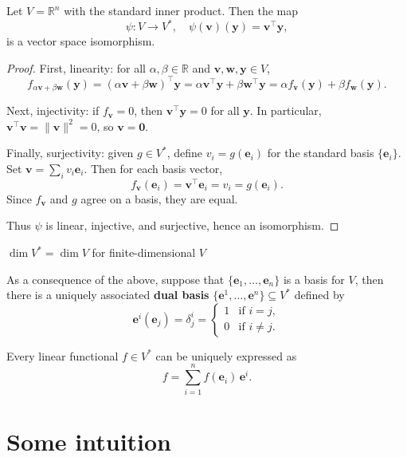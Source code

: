 \begin{theorem}\label{isomorphism}
Let $V = \mathbb{R}^n$ with the standard inner product. 
Then the map
\[
\psi : V \to V^*, \quad 
\psi(\mathbf{v})(\mathbf{y}) = \mathbf{v}^\top \mathbf{y},
\]
is a vector space isomorphism.
\begin{proof}
First, linearity: for all $\alpha,\beta \in \mathbb{R}$ and $\mathbf{v},\mathbf{w},\mathbf{y} \in V$,
\[
f_{\alpha \mathbf{v} + \beta \mathbf{w}}(\mathbf{y}) 
= (\alpha \mathbf{v} + \beta \mathbf{w})^\top \mathbf{y} 
= \alpha \mathbf{v}^\top \mathbf{y} + \beta \mathbf{w}^\top \mathbf{y} 
= \alpha f_{\mathbf{v}}(\mathbf{y}) + \beta f_{\mathbf{w}}(\mathbf{y}).
\]

Next, injectivity: if $f_{\mathbf{v}} = 0$, then $\mathbf{v}^\top \mathbf{y} = 0$ for all $\mathbf{y}$.  
In particular, $\mathbf{v}^\top \mathbf{v} = \|\mathbf{v}\|^2 = 0$, so $\mathbf{v} = \mathbf{0}$.  

Finally, surjectivity: given $g \in V^*$, define $v_i = g(\mathbf{e}_i)$ for the standard basis $\{\mathbf{e}_i\}$.  
Set $\mathbf{v} = \sum_i v_i \mathbf{e}_i$. Then for each basis vector,
\[
f_{\mathbf{v}}(\mathbf{e}_i) = \mathbf{v}^\top \mathbf{e}_i = v_i = g(\mathbf{e}_i).
\]
Since $f_{\mathbf{v}}$ and $g$ agree on a basis, they are equal.  

Thus $\psi$ is linear, injective, and surjective, hence an isomorphism.
\end{proof}
\end{theorem}
\begin{corollary}
$\dim V^* = \dim V$ for finite-dimensional $V$
\end{corollary}

As a consequence of the above, suppose that $ \{ \mathbf{e}_1, \dots, \mathbf{e}_n \} $ is a basis for $ V $, then there is a uniquely associated \textbf{dual basis} $ \{ \mathbf{e}^1, \dots, \mathbf{e}^n \} \subseteq V^* $ defined by
    \[
    \mathbf{e}^i(\mathbf{e}_j) = \delta^i_j =
    \begin{cases}
    1 & \text{if } i = j, \\
    0 & \text{if } i \ne j.
    \end{cases}
    \]
    
    Every linear functional $ f \in V^* $ can be uniquely expressed as
    \[
    f = \sum_{i=1}^n f(\mathbf{e}_i) \, \mathbf{e}^i.
    \]

\section*{\Large Some intuition}

